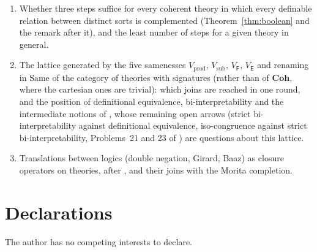 \documentclass[11pt]{amsart}
\theoremstyle{definition}
\newcommand{\Same}{\mathrm{Same}}
\newcommand{\Coh}{\mathbf{Coh}}
\newcommand{\FF}{\mathsf F}
\newcommand{\EE}{\mathsf E}
\begin{document}
\begin{enumerate}
\item Whether three steps suffice for every coherent theory in which every
definable relation between distinct sorts is complemented
(Theorem~\ref{thm:boolean} and the remark after it), and the least
number of steps for a given theory in general.
\item The lattice generated by the five samenesses $V_{\mathrm{prod}}$,
$V_{\mathrm{sub}}$, $V_\FF$, $V_\EE$ and renaming in $\Same$ of the
category of theories with signatures (rather than of $\Coh$, where the
cartesian ones are trivial): which joins are reached in one round, and
the position of definitional equivalence, bi-interpretability
\cite{FV25} and the intermediate notions of \cite{Meadows24}, whose
remaining open arrows (strict bi-interpretability against definitional
equivalence, iso-congruence against strict bi-interpretability,
Problems~21 and 23 of \cite{Meadows24}) are questions about this
lattice.
\item Translations between logics (double negation, Girard, Baaz) as
closure operators on theories, after \cite[\S4.10]{Maruyama16}, and their
joins with the Morita completion.
\end{enumerate}

\section*{Declarations}
The author has no competing interests to declare.
\end{document}
